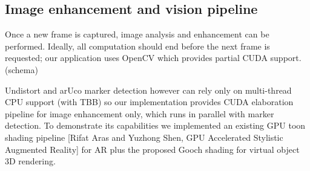 
\subsection{Image enhancement and vision pipeline}
Once a new frame is captured, image analysis and enhancement can be performed. Ideally, all computation should end before the next frame is requested; our application uses OpenCV which provides partial CUDA support.\\

(schema)

Undistort and arUco marker detection however can rely only on multi-thread CPU support (with TBB) so our implementation provides CUDA elaboration pipeline for image enhancement only, which runs in parallel with marker detection. To demonstrate its capabilities we implemented an existing GPU toon shading pipeline [Rifat Aras and Yuzhong Shen, GPU Accelerated Stylistic Augmented Reality] for AR plus the proposed Gooch shading for virtual object 3D rendering.

